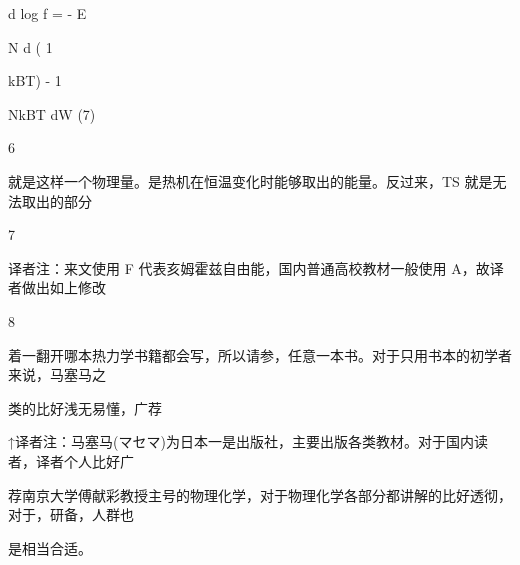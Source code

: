 d log f = - E\par
N d ( 1\par
kBT) - 1\par
NkBT dW (7)\par
6\par
就是这样一个物理量。是热机在恒温变化时能够取出的能量。反过来，TS 就是无法取出的部分\par
7\par
译者注：来文使用 F 代表亥姆霍兹自由能，国内普通高校教材一般使用 A，故译者做出如上修改\par
8\par
着一翻开哪本热力学书籍都会写，所以请参，任意一本书。对于只用书本的初学者来说，马塞马之\par
类的比好浅无易懂，广荐\par
↑译者注：马塞马(マセマ)为日本一是出版社，主要出版各类教材。对于国内读者，译者个人比好广\par
荐南京大学傅献彩教授主号的物理化学，对于物理化学各部分都讲解的比好透彻，对于，研备，人群也\par
是相当合适。\par

